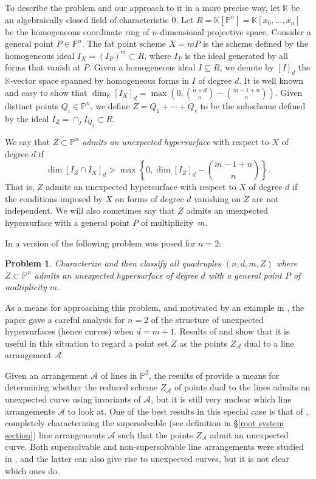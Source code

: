 \documentclass[12pt]{amsart}
\numberwithin{equation}{section}
\newtheorem{problem}[theorem]{Problem}
\theoremstyle{definition}
\newcommand{\PP}{ \ensuremath{\mathbb{P}}}
\newcommand{\KK}{ \ensuremath{\mathbb{K}}}
\newcommand{\mA}{\mathcal{A}}
\begin{document}
To describe the problem and our approach to it in a more precise way, let $\KK$ be an algebraically closed field of characteristic 0. 
Let $R=\KK[\PP^n]=\KK[x_0,\ldots,x_n]$ be the homogeneous coordinate ring of 
$n$-dimensional projective space.
Consider a general point $P\in\PP^n$.
The fat point scheme $X=mP$ is the scheme defined by the homogeneous ideal
$I_X=(I_{P})^{m} \subset R$, where $I_{P}$ is the ideal generated by all forms that vanish at $P$.
Given a homogeneous ideal $I\subseteq R$, we denote by $[I]_d$ the $\KK$-vector space spanned by homogeneous forms in 
$I$ of degree $d$. It is well known and easy to show that $\dim_\KK[I_X]_d=\max(0,\binom{n+d}{n}-\binom{m-1+n}{n})$.
Given distinct points $Q_i\in\PP^n$, we define $Z=Q_1+\cdots +Q_s$ to be the subscheme defined
by the ideal $I_Z=\cap_jI_{Q_j}\subset R$. 

We say that $Z\subset\PP^n$ {\em admits an unexpected hypersurface} with respect to $X$ of degree $d$ if
$$\dim [I_Z\cap I_X]_d > \max \left \{ 0, \dim [I_Z]_d-\binom{m-1+n}{n} \right \}.$$
That is, $Z$ admits an unexpected hypersurface with respect to $X$ of degree $d$ if the conditions imposed by $X$
on forms of degree $d$ vanishing on $Z$ are not independent. We will also sometimes say that $Z$ admits an unexpected 
hypersurface with a general point $P$ of multiplicity~$m$.

In \cite{CHMN} a version of the following problem was posed for $n=2$:

\begin{problem}\label{prob:intro}
Characterize and then classify all  quadruples $(n,d,m,Z)$
where $Z\subset\PP^n$ admits an unexpected 
hypersurface of degree $d$ with a general point $P$ of multiplicity $m$.
\end{problem}

As a means for approaching this problem, and motivated by an example in \cite{DIV}, the paper \cite{CHMN} gave a 
careful analysis for $n=2$ of the structure of unexpected hypersurfaces (hence curves) when $d=m+1$.
Results of \cite{DIV} and \cite{FV} show that it is useful in this situation to regard a point set $Z$ as the 
points $Z_\mA$ dual to a line arrangement $\mA$.

Given an arrangement $\mA$ of lines in $\PP^2$, the results of \cite{CHMN} provide a means for determining whether
the reduced scheme $Z_\mA$ of points dual to the lines admits an unexpected curve using invariants of $\mA$, but it is still very unclear
which line arrangements $\mA$ to look at.
One of the best results in this special case is that of \cite{DMO}, completely characterizing the supersolvable (see definition in \S\ref{root system section}) line arrangements $\mA$
such that the points $Z_\mA$ admit an unexpected curve. 
Both supersolvable and non-supersolvable line arrangements were  studied in \cite{CHMN}, and the latter can 
also give rise to unexpected curves, but it is not clear which ones do. 
\end{document}
